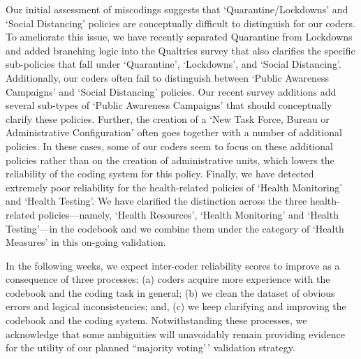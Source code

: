 \documentclass[
]{article}
\begin{document}
Our initial assessment of miscodings suggests that `Quarantine/Lockdowns' and `Social Distancing' policies are conceptually difficult to distinguish for our coders. To ameliorate this issue, we have recently separated Quarantine from Lockdowns and added branching logic into the Qualtrics survey that also clarifies the specific sub-policies that fall under `Quarantine', `Lockdowns', and `Social Distancing'. Additionally, our coders often fail to distinguish between `Public Awareness Campaigns' and `Social Distancing' policies. Our recent survey additions add several sub-types of `Public Awareness Campaigns' that should conceptually clarify these policies. Further, the creation of a `New Task Force, Bureau or Administrative Configuration' often goes together with a number of additional policies. In these cases, some of our coders seem to focus on these additional policies rather than on the creation of administrative units, which lowers the reliability of the coding system for this policy. Finally, we have detected extremely poor reliability for the health-related policies of `Health Monitoring' and `Health Testing'. We have clarified the distinction across the three health-related policies---namely, `Health Resources', `Health Monitoring' and `Health Testing'---in the codebook and we combine them under the category of `Health Measures' in this on-going validation.

In the following weeks, we expect inter-coder reliability scores to improve as a consequence of three processes: (a) coders acquire more experience with the codebook and the coding task in general; (b) we clean the dataset of obvious errors and logical inconsistencies; and, (c) we keep clarifying and improving the codebook and the coding system. Notwithstanding these processes, we acknowledge that some ambiguities will unavoidably remain providing evidence for the utility of our planned ``majority voting'\,' validation strategy.
\end{document}
